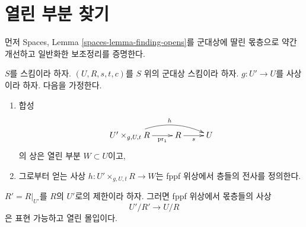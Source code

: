 \section{열린 부분 찾기}
\label{section-finding-opens}


\medskip\noindent
먼저 Spaces, Lemma \ref{spaces-lemma-finding-opens}를 군대상에 딸린
몫층으로 약간 개선하고 일반화한 보조정리를 증명한다.

\begin{lemma}
\label{lemma-better-finding-opens}
$S$를 스킴이라 하자.
$(U, R, s, t, c)$를 $S$ 위의 군대상 스킴이라 하자.
$g : U' \to U$를 사상이라 하자. 다음을 가정한다.
\begin{enumerate}
\item 합성
$$
\xymatrix{
U' \times_{g, U, t} R \ar[r]_-{\text{pr}_1} \ar@/^3ex/[rr]^h
& R \ar[r]_s & U
}
$$
의 상은 열린 부분 $W \subset U$이고,
\item 그로부터 얻는 사상 $h : U' \times_{g, U, t} R \to W$는 fppf
위상에서 층들의 전사를 정의한다.
\end{enumerate}
$R' = R|_{U'}$를 $R$의 $U'$로의 제한이라 하자. 그러면 fppf 위상에서
몫층들의 사상
$$
U'/R' \to U/R
$$
은 표현 가능하고 열린 몰입이다.
\end{lemma}


